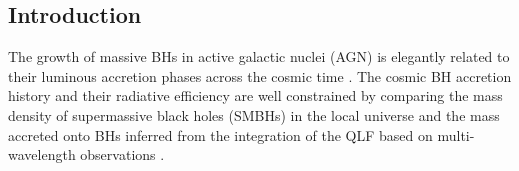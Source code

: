 \documentclass[twocolumn, twocolappendix]{aastex63}
\begin{document}
\begin{CJK*}{UTF8}{gbsn}



\vspace{5mm}
\section{Introduction} \label{sec:intro}
The growth of massive BHs in active galactic nuclei (AGN) is elegantly related to their luminous accretion phases
across the cosmic time \citep{1982MNRAS.200..115S}.
The cosmic BH accretion history and their radiative efficiency are well constrained by 
comparing the mass density of supermassive black holes (SMBHs) in the local universe and the mass accreted onto BHs inferred from
the integration of the QLF based on multi-wavelength observations
\citep[e.g.][]{1971ApJ...170..223C,1992MNRAS.259..725S,2002MNRAS.335..965Y,2004MNRAS.351..169M,2008MNRAS.388.1011M,2004MNRAS.354.1020S,
2009ApJ...690...20S,2014MNRAS.439.2736D,2014ApJ...786..104U,2017A&A...600A..64T,2022ApJ...934...66S}.



\end{CJK*}
\end{document}
